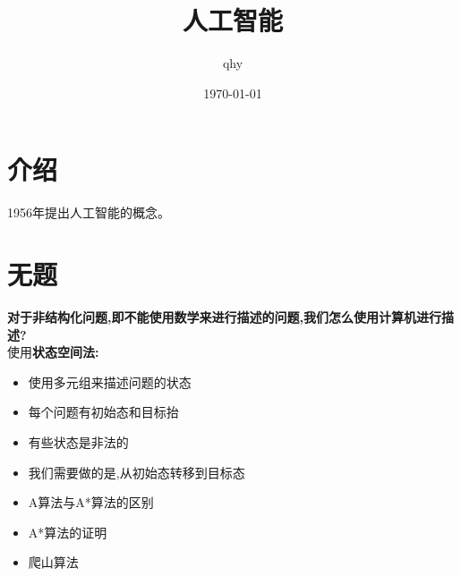 \documentclass[UTF8,a4paper]{ctexart}
\author{ qhy }
\date{\today}
\title{人工智能}
\begin{document}
  \maketitle
  \tableofcontents
  \newpage

  \section{介绍}
  1956年提出人工智能的概念。

  \section{无题}
  \textbf{对于非结构化问题,即不能使用数学来进行描述的问题,我们怎么使用计算机进行描述?}\\
  使用\textbf{状态空间法:}
  \begin{itemize}
    \item 使用多元组来描述问题的状态
    \item 每个问题有初始态和目标抬
    \item 有些状态是非法的
    \item 我们需要做的是,从初始态转移到目标态
  \end{itemize}

  \begin{itemize}
    \item A算法与A*算法的区别
    \item A*算法的证明
    \item 爬山算法
  \end{itemize}
\end{document}
